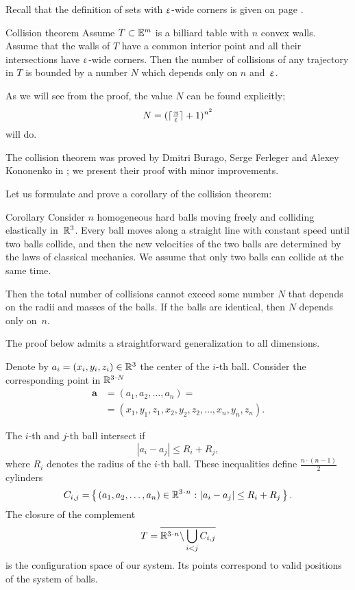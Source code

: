 Recall that the definition of sets with $\upvarepsilon$-wide corners is given on page \pageref{page:wide corners}.

\begin{thm}{Collision theorem}\label{thm:collision}
Assume $T\subset\EE^m$ is a billiard table with $n$ convex walls.
Assume that the walls of $T$ have a common interior point  and all their intersections have $\upvarepsilon$-wide corners.
Then the number of collisions of any trajectory in  $T$  is bounded
by a number $N$ which depends only on $n$ and~$\upvarepsilon$.
\end{thm}

As we will see from the proof,
the value $N$ can be found explicitly;
\[N=(\lceil\tfrac{\uppi}{\upvarepsilon}\rceil+1)^{n^2}\]
will do.

The collision theorem was proved by Dmitri Burago, Serge Ferleger and Alexey Kononenko in \cite{BFK};
we present their proof with minor improvements.

Let us formulate and prove a corollary of the  collision theorem:

\begin{thm}{Corollary}\label{cor:balls}
Consider $n$ homogeneous hard balls
moving freely and colliding
elastically in~$\mathbb{R}^3$. 
Every ball moves
along a straight line with constant speed until two balls collide, and then
the new velocities of the two balls are determined by the
laws of classical mechanics. 
We assume that only two balls can collide at the same time.

Then the total number of collisions cannot exceed some number $N$ that  depends on the radii and masses of the balls.
If the balls are identical, then $N$ depends only on~$n$.
\end{thm}


The proof below admits a straightforward generalization to all dimensions.

Denote by $a_i=(x_i,y_i,z_i) \in \RR^3$ the center of the $i$-th ball.
Consider the corresponding point in $\RR^{3\cdot N}$
\begin{align*}
\bm{a}&=(a_1, a_2 , \dots , a_n ) =
\\
&=(x_1, y_1 , z_1 , x_2 , y_2 , z_2 , \dots , x_n , y_n , z_n).
\end{align*}

The $i$-th and $j$-th ball intersect if 
$$|a_i - a_j | \le R_i+R_j,$$
where $R_i$ denotes the radius of the $i$-th ball.
These inequalities define $\tfrac{n\cdot(n-1)}{2}$ cylinders 
\[C_{i,j}=\set{(a_1, a_2 , \dots , a_n )\in\RR^{3\cdot n}} {|a_i - a_j |\le R_i+R_j}.\] 
The closure of the complement
\[T=\overline{\RR^{3\cdot n}\backslash \bigcup_{i< j} C_{i,j}}\] 
is the configuration space of our system. 
Its points correspond
to valid positions of the system of balls.

